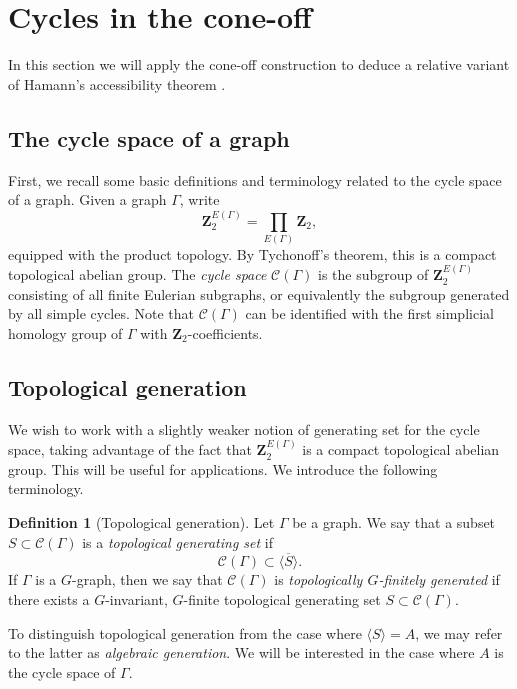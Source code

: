 \documentclass[11pt,a4paper]{amsart}
\newcommand{\Z}{\mathbf{Z}}
\theoremstyle{definition}
\newtheorem{definition}[theorem]{Definition}
\newcommand{\cyc}{\mathscr{C}}
\begin{document}


\section{Cycles in the cone-off}

In this section we will apply the cone-off construction to deduce a relative variant of Hamann's accessibility theorem \cite{hamann2018accessibility}.


\subsection{The cycle space of a graph} First, we recall some basic definitions and terminology related to the cycle space of a graph. 
Given a graph $\Gamma$, write 
$$
\Z_2^{E(\Gamma)} = \prod_{E(\Gamma)}\Z_2,
$$
equipped with the product topology. By Tychonoff's theorem, this is a compact topological abelian group. The \emph{cycle space} $\cyc(\Gamma)$ is the subgroup of $\Z_2^{E(\Gamma)}$ consisting of all finite Eulerian subgraphs, or equivalently the subgroup generated by all simple cycles. Note that $\cyc(\Gamma)$ can be identified with the first simplicial homology group of $\Gamma$ with $\Z_2$-coefficients. 


\subsection{Topological generation}\label{sec:top-gen}

We wish to work with a slightly weaker notion of generating set for the cycle space, taking advantage of the fact that $\Z_2^{E(\Gamma)}$ is a compact topological abelian group. This will be useful for applications. 
We introduce the following terminology.

\begin{definition}[Topological generation]\label{def:topological-finite-gen}
    Let $\Gamma$ be a graph. We say that a subset $S \subset \cyc(\Gamma)$ is a \emph{topological generating set} if 
    $$
    \cyc(\Gamma) \subset \overline {\langle  S \rangle}.
    $$
    If $\Gamma$ is a $G$-graph, then we say that $\cyc(\Gamma)$ is \emph{topologically $G$-finitely generated} if there exists a $G$-invariant, $G$-finite topological generating set $S \subset \cyc(\Gamma)$.
\end{definition}

To distinguish topological generation from the case where $\langle S \rangle = A$, we may refer to the latter as \emph{algebraic generation}. 
We will be interested in the case where $A$ is the cycle space of $\Gamma$. 
\end{document}
